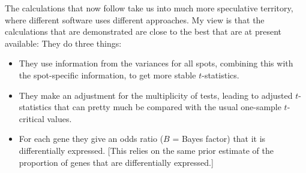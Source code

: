 \documentclass[a4paper,9pt]{article}\usepackage[]{graphicx}\usepackage[]{color}
\begin{document}
The calculations that now follow take us into much more speculative
territory, where different software uses different approaches.
My view is that the calculations that are demonstrated are close
to the best that are at present available:  They do three things:
\begin{itemize}
\item They use information from the variances for all spots,
combining this with the spot-specific information, to get
more stable $t$-statistics.
\item They make an adjustment for the multiplicity of tests,
leading to adjusted $t$-statistics that can pretty much be
compared with the usual one-sample $t$-critical values.
\item For each gene they give an odds ratio ($B$ = Bayes factor) that
      it is differentially expressed.  [This relies on the same prior
      estimate of the proportion of genes that are differentially
      expressed.]
\end{itemize}
\end{document}
